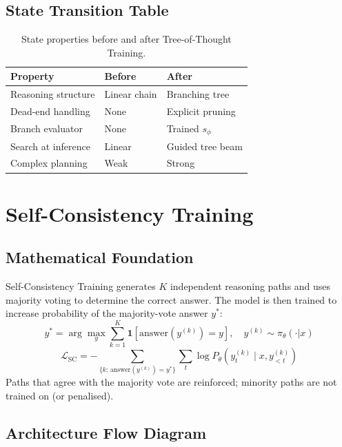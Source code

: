 \documentclass{article}
\begin{document}
\subsection{State Transition Table}
\begin{table}[h]\centering
\begin{tabular}{lll}\toprule
\textbf{Property} & \textbf{Before} & \textbf{After}\\\midrule
Reasoning structure & Linear chain & Branching tree\\
Dead-end handling & None & Explicit pruning\\
Branch evaluator & None & Trained $s_\phi$\\
Search at inference & Linear & Guided tree beam\\
Complex planning & Weak & Strong\\\bottomrule
\end{tabular}
\caption{State properties before and after Tree-of-Thought Training.}
\end{table}

\newpage
\section{Self-Consistency Training}

\subsection{Mathematical Foundation}
Self-Consistency Training generates $K$ independent reasoning paths and uses majority voting to determine the correct answer. The model is then trained to increase probability of the majority-vote answer $y^*$:
\begin{equation}
  y^* = \arg\max_{y} \sum_{k=1}^K \mathbf{1}[\text{answer}(y^{(k)}) = y],\quad y^{(k)} \sim \pi_\theta(\cdot|x)
\end{equation}
\begin{equation}
  \mathcal{L}_{\text{SC}} = -\sum_{\{k:\,\text{answer}(y^{(k)})=y^*\}} \sum_t \log P_\theta(y^{(k)}_t \mid x, y^{(k)}_{<t})
\end{equation}
Paths that agree with the majority vote are reinforced; minority paths are not trained on (or penalised).

\subsection{Architecture Flow Diagram}
\end{document}
